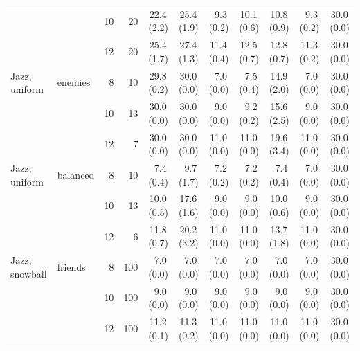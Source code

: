 \begin{table}[p]
{\begin{tabular}{llrrrrrrrrr}
 &  & 10 & 20 & 22.4\,{\scriptsize(2.2)} & 25.4\,{\scriptsize(1.9)} & 9.3\,{\scriptsize(0.2)} & 10.1\,{\scriptsize(0.6)} & 10.8\,{\scriptsize(0.9)} & 9.3\,{\scriptsize(0.2)} & 30.0\,{\scriptsize(0.0)} \\
 &  & 12 & 20 & 25.4\,{\scriptsize(1.7)} & 27.4\,{\scriptsize(1.3)} & 11.4\,{\scriptsize(0.4)} & 12.5\,{\scriptsize(0.7)} & 12.8\,{\scriptsize(0.7)} & 11.3\,{\scriptsize(0.2)} & 30.0\,{\scriptsize(0.0)} \\
\addlinespace[1pt]
Jazz, uniform & enemies & 8 & 10 & 29.8\,{\scriptsize(0.2)} & 30.0\,{\scriptsize(0.0)} & 7.0\,{\scriptsize(0.0)} & 7.5\,{\scriptsize(0.4)} & 14.9\,{\scriptsize(2.0)} & 7.0\,{\scriptsize(0.0)} & 30.0\,{\scriptsize(0.0)} \\
 &  & 10 & 13 & 30.0\,{\scriptsize(0.0)} & 30.0\,{\scriptsize(0.0)} & 9.0\,{\scriptsize(0.0)} & 9.2\,{\scriptsize(0.2)} & 15.6\,{\scriptsize(2.5)} & 9.0\,{\scriptsize(0.0)} & 30.0\,{\scriptsize(0.0)} \\
 &  & 12 & 7 & 30.0\,{\scriptsize(0.0)} & 30.0\,{\scriptsize(0.0)} & 11.0\,{\scriptsize(0.0)} & 11.0\,{\scriptsize(0.0)} & 19.6\,{\scriptsize(3.4)} & 11.0\,{\scriptsize(0.0)} & 30.0\,{\scriptsize(0.0)} \\
\addlinespace[1pt]
Jazz, uniform & balanced & 8 & 10 & 7.4\,{\scriptsize(0.4)} & 9.7\,{\scriptsize(1.7)} & 7.2\,{\scriptsize(0.2)} & 7.2\,{\scriptsize(0.2)} & 7.4\,{\scriptsize(0.4)} & 7.0\,{\scriptsize(0.0)} & 30.0\,{\scriptsize(0.0)} \\
 &  & 10 & 13 & 10.0\,{\scriptsize(0.5)} & 17.6\,{\scriptsize(1.6)} & 9.0\,{\scriptsize(0.0)} & 9.0\,{\scriptsize(0.0)} & 10.0\,{\scriptsize(0.6)} & 9.0\,{\scriptsize(0.0)} & 30.0\,{\scriptsize(0.0)} \\
 &  & 12 & 6 & 11.8\,{\scriptsize(0.7)} & 20.2\,{\scriptsize(3.2)} & 11.0\,{\scriptsize(0.0)} & 11.0\,{\scriptsize(0.0)} & 13.7\,{\scriptsize(1.8)} & 11.0\,{\scriptsize(0.0)} & 30.0\,{\scriptsize(0.0)} \\
\midrule
Jazz, snowball & friends & 8 & 100 & 7.0\,{\scriptsize(0.0)} & 7.0\,{\scriptsize(0.0)} & 7.0\,{\scriptsize(0.0)} & 7.0\,{\scriptsize(0.0)} & 7.0\,{\scriptsize(0.0)} & 7.0\,{\scriptsize(0.0)} & 30.0\,{\scriptsize(0.0)} \\
 &  & 10 & 100 & 9.0\,{\scriptsize(0.0)} & 9.0\,{\scriptsize(0.0)} & 9.0\,{\scriptsize(0.0)} & 9.0\,{\scriptsize(0.0)} & 9.0\,{\scriptsize(0.0)} & 9.0\,{\scriptsize(0.0)} & 30.0\,{\scriptsize(0.0)} \\
 &  & 12 & 100 & 11.2\,{\scriptsize(0.1)} & 11.3\,{\scriptsize(0.2)} & 11.0\,{\scriptsize(0.0)} & 11.0\,{\scriptsize(0.0)} & 11.0\,{\scriptsize(0.0)} & 11.0\,{\scriptsize(0.0)} & 30.0\,{\scriptsize(0.0)} \\

\end{tabular}}
\end{table}
